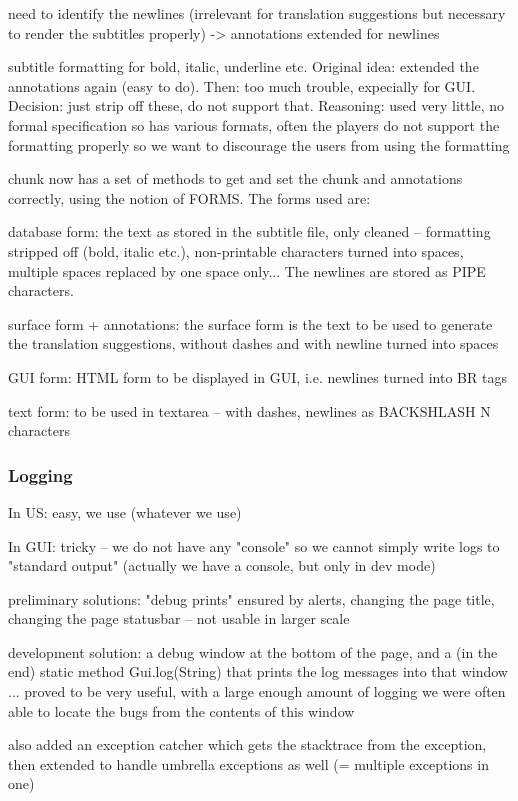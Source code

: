need to identify the newlines (irrelevant for translation suggestions but necessary to render the subtitles properly) -> annotations extended for newlines

subtitle formatting for bold, italic, underline etc. Original idea: extended the annotations again (easy to do). Then: too much trouble, expecially for GUI. Decision: just strip off these, do not support that. Reasoning: used very little, no formal specification so has various formats, often the players do not support the formatting properly so we want to discourage the users from using the formatting

chunk now has a set of methods to get and set the chunk and annotations correctly, using the notion of FORMS. The forms used are:

database form: the text as stored in the subtitle file, only cleaned -- formatting stripped off (bold, italic etc.), non-printable characters turned into spaces, multiple spaces replaced by one space only... The newlines are stored as PIPE characters.

surface form + annotations: the surface form is the text to be used to generate the translation suggestions, without dashes and with newline turned into spaces

GUI form: HTML form to be displayed in GUI, i.e. newlines turned into BR tags

text form: to be used in textarea -- with dashes, newlines as BACKSHLASH N characters

\subsubsection{Logging}

In US: easy, we use (whatever we use)


In GUI: tricky -- we do not have any "console" so we cannot simply write logs to "standard output"
(actually we have a console, but only in dev mode)

preliminary solutions: "debug prints" ensured by alerts, changing the page title, changing the page statusbar -- not usable in larger scale

development solution: a debug window at the bottom of the page, and a (in the end) static method Gui.log(String) that prints the log messages into that window
... proved to be very useful, with a large enough amount of logging we were often able to locate the bugs from the contents of this window

also added an exception catcher which gets the stacktrace from the exception, then extended to handle umbrella exceptions as well (= multiple exceptions in one)

